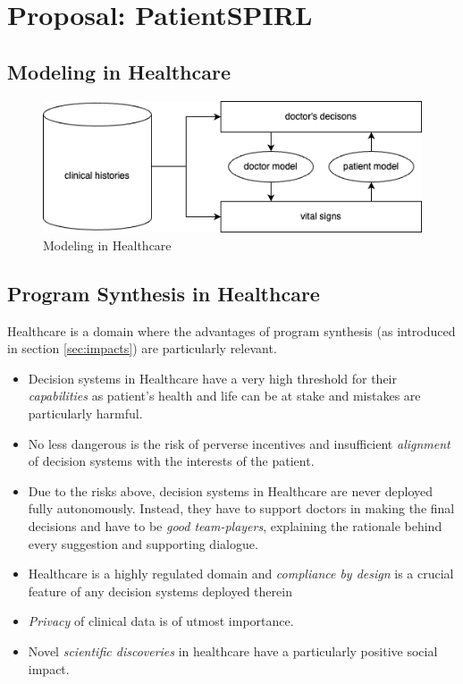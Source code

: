 \chapter{Proposal: PatientSPIRL}
\label{ch:proposal}

\section{Modeling in Healthcare}

\begin{figure}
  \centering
  \includegraphics[width=0.8\linewidth]{images/PatientModeling.drawio.png}
  \caption{Modeling in Healthcare}
  \label{fig:modelhealth}
\end{figure}


\newpage
\section{Program Synthesis in Healthcare}

Healthcare is a domain where the advantages of program synthesis (as introduced in section \ref{sec:impacts}) are particularly relevant.
\begin{itemize}
    \item Decision systems in Healthcare have a very high threshold for their \emph{capabilities} as patient's health and life can be at stake and mistakes are particularly harmful.
    \item No less dangerous is the risk of perverse incentives and insufficient \emph{alignment} of decision systems with the interests of the patient.
    \item Due to the risks above, decision systems in Healthcare are never deployed fully autonomously. Instead, they have to support doctors in making the final decisions and have to be \emph{good team-players}, explaining the rationale behind every suggestion and supporting dialogue.
    \item Healthcare is a highly regulated domain and \emph{compliance by design} is a crucial feature of any decision systems deployed therein
    \item \emph{Privacy} of clinical data is of utmost importance.
    \item Novel \emph{scientific discoveries} in healthcare have a particularly positive social impact.
\end{itemize}

